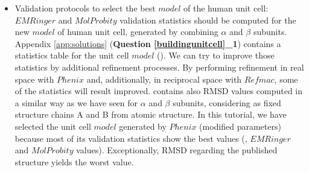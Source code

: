 \begin{itemize}
 \item Validation protocols to select the best $model$ of the human  unit cell:\\
 
 $EMRinger$ and $MolProbity$ validation statistics should be computed for the new $model$ of human  unit cell, generated by combining  $\alpha$ and $\beta$ subunits. Appendix \ref{app:solutions} (\textbf{Question \ref{buildingunitcell}\_1}) contains a statistics table for the unit cell $model$ (). We can try to improve those statistics by additional refinement processes. By performing refinement in real space with $Phenix$ and, additionally, in reciprocal space with $Refmac$, some of the statistics will result improved.  contains also RMSD values computed in a similar way as we have seen for $\alpha$ and $\beta$ subunits, considering as fixed structure chains A and B from  atomic structure. In this tutorial, we have selected the unit cell $model$ generated by $Phenix$  (modified parameters) because most of its validation statistics show the best values (\ccmask, $EMRinger$  and $MolProbity$ values). Exceptionally, RMSD regarding the published structure yields the worst value.
 
\end{itemize}

